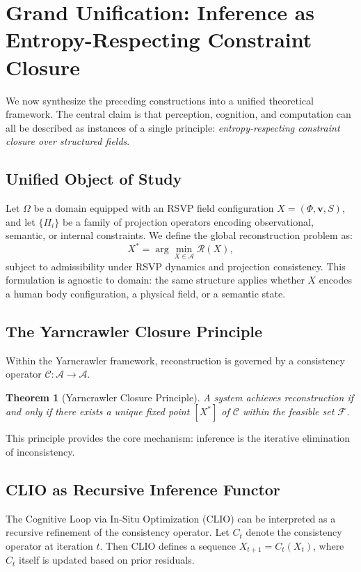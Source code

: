 \documentclass[12pt]{article}
\newtheorem{theorem}{Theorem}
\begin{document}
\section{Grand Unification: Inference as Entropy-Respecting Constraint Closure}

We now synthesize the preceding constructions into a unified theoretical framework. The central claim is that perception, cognition, and computation can all be described as instances of a single principle: \emph{entropy-respecting constraint closure over structured fields}.

\subsection{Unified Object of Study}

Let $\Omega$ be a domain equipped with an RSVP field configuration $X = (\Phi, \mathbf{v}, S)$, and let $\{\Pi_i\}$ be a family of projection operators encoding observational, semantic, or internal constraints. We define the global reconstruction problem as:
\[
X^* = \arg\min_{X \in \mathcal{A}} \mathcal{R}(X),
\]
subject to admissibility under RSVP dynamics and projection consistency. This formulation is agnostic to domain: the same structure applies whether $X$ encodes a human body configuration, a physical field, or a semantic state.

\subsection{The Yarncrawler Closure Principle}

Within the Yarncrawler framework, reconstruction is governed by a consistency operator $\mathcal{C} : \mathcal{A} \to \mathcal{A}$.

\begin{theorem}[Yarncrawler Closure Principle]
A system achieves reconstruction if and only if there exists a unique fixed point $[X^*]$ of $\mathcal{C}$ within the feasible set $\mathcal{F}$.
\end{theorem}

This principle provides the core mechanism: inference is the iterative elimination of inconsistency.

\subsection{CLIO as Recursive Inference Functor}

The Cognitive Loop via In-Situ Optimization (CLIO) can be interpreted as a recursive refinement of the consistency operator. Let $C_t$ denote the consistency operator at iteration $t$. Then CLIO defines a sequence $X_{t+1} = C_t(X_t)$, where $C_t$ itself is updated based on prior residuals.
\end{document}
